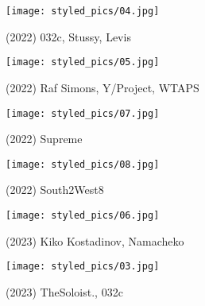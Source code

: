 \begin{minipage}[h!]{0.5\textwidth}
    \begin{figure}[H]
        \centering
        \texttt{[image: styled\_pics/04.jpg]}
        \caption*{(2022) 032c, Stussy, Levis}
    \end{figure}
\end{minipage}
\begin{minipage}[h!]{0.5\textwidth}
    \begin{figure}[H]
        \centering
        \texttt{[image: styled\_pics/05.jpg]}
        \caption*{(2022) Raf Simons, Y/Project, WTAPS}
    \end{figure}
\end{minipage}
\begin{minipage}[h!]{0.5\textwidth}
    \begin{figure}[H]
        \centering
        \texttt{[image: styled\_pics/07.jpg]}
        \caption*{(2022) Supreme}
    \end{figure}
\end{minipage}
\begin{minipage}[h!]{0.5\textwidth}
    \begin{figure}[H]
        \texttt{[image: styled\_pics/08.jpg]}
        \caption*{(2022) South2West8}
    \end{figure}
\end{minipage}
\begin{minipage}[h!]{0.5\textwidth}
    \begin{figure}[H]
        \centering
        \texttt{[image: styled\_pics/06.jpg]}
        \caption*{(2023) Kiko Kostadinov, Namacheko}
    \end{figure}
\end{minipage}
\begin{minipage}[h!]{0.5\textwidth}
    \begin{figure}[H]
        \centering
        \texttt{[image: styled\_pics/03.jpg]}
        \caption*{(2023) TheSoloist., 032c}
    \end{figure}
\end{minipage}

